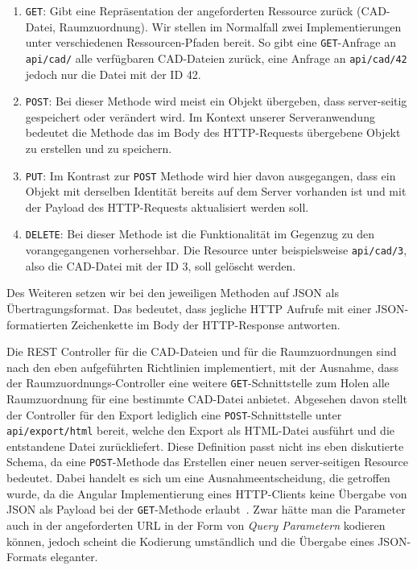 \begin{enumerate}
    \item \texttt{GET}: Gibt eine Repräsentation der angeforderten Ressource zurück (CAD-Datei, Raumzuordnung).
    Wir stellen im Normalfall zwei Implementierungen unter verschiedenen Ressourcen-Pfaden bereit.
    So gibt eine \texttt{GET}-Anfrage an \texttt{api/cad/} alle verfügbaren CAD-Dateien zurück, eine Anfrage an \texttt{api/cad/42} jedoch nur die Datei mit der ID 42.
    \item \texttt{POST}: Bei dieser Methode wird meist ein Objekt übergeben, dass server-seitig gespeichert oder verändert wird.
    Im Kontext unserer Serveranwendung bedeutet die Methode das im Body des HTTP-Requests übergebene Objekt zu erstellen und zu speichern.
    \item \texttt{PUT}: Im Kontrast zur \texttt{POST} Methode wird hier davon ausgegangen, dass ein Objekt mit derselben Identität bereits auf dem Server vorhanden ist und mit der Payload des HTTP-Requests aktualisiert werden soll.
    \item \texttt{DELETE}: Bei dieser Methode ist die Funktionalität im Gegenzug zu den vorangegangenen vorhersehbar.
    Die Resource unter beispielsweise \texttt{api/cad/3}, also die CAD-Datei mit der ID 3, soll gelöscht werden.
\end{enumerate}

Des Weiteren setzen wir bei den jeweiligen Methoden auf JSON als Übertragungsformat.
Das bedeutet, dass jegliche HTTP Aufrufe mit einer JSON-formatierten Zeichenkette im Body der HTTP-Response antworten.

Die REST Controller für die CAD-Dateien und für die Raumzuordnungen sind nach den eben aufgeführten Richtlinien implementiert, mit der Ausnahme, dass der Raumzuordnungs-Controller eine weitere \texttt{GET}-Schnittstelle zum Holen alle Raumzuordnung für eine bestimmte CAD-Datei anbietet.
Abgesehen davon stellt der Controller für den Export lediglich eine \texttt{POST}-Schnittstelle unter \texttt{api/export/html} bereit, welche den Export als HTML-Datei ausführt und die entstandene Datei zurückliefert.
Diese Definition passt nicht ins eben diskutierte Schema, da eine \texttt{POST}-Methode das Erstellen einer neuen server-seitigen Resource bedeutet.
Dabei handelt es sich um eine Ausnahmeentscheidung, die getroffen wurde, da die Angular Implementierung eines HTTP-Clients keine Übergabe von JSON als Payload bei der \texttt{GET}-Methode erlaubt~\cite{AngularHttpClientGet}.
Zwar hätte man die Parameter auch in der angeforderten URL in der Form von \textit{Query Parametern} kodieren können, jedoch scheint die Kodierung umständlich und die Übergabe eines JSON-Formats eleganter.

